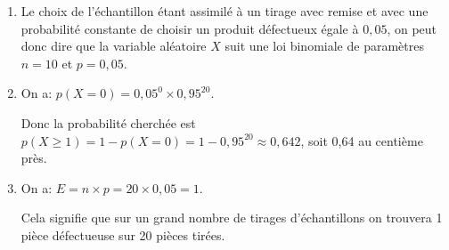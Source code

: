 \begin{enumerate}
\item %
Le choix de l'échantillon étant assimilé à un tirage avec remise et avec une probabilité constante de choisir un produit défectueux égale à $ 0,05$, on peut donc dire que la variable aléatoire $X$ suit une loi binomiale de paramètres $n = 10$ et $p  = 0,05$.
\item %

On a: $p(X = 0) = 0,05^0 \times 0,95^{20}$.

Donc la probabilité cherchée est $p(X \geqslant 1) = 1 -p(X =0) = 1 - 0,95^{20} \approx 0,642$, soit 0,64 au centième près.
\item %
On a: $E = n \times p = 20 \times 0,05 = 1$.

Cela signifie que sur un grand nombre de tirages d'échantillons on trouvera 1 pièce défectueuse sur 20 pièces tirées.
\end{enumerate}

\vspace{0,5cm}

